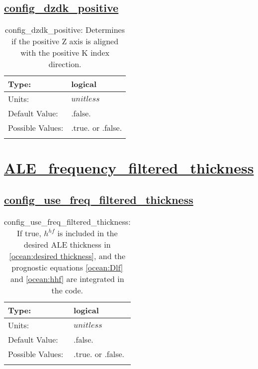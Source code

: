 \subsection[config\_dzdk\_positive]{\hyperref[sec:nm_tab_ALE_vertical_grid]{config\_dzdk\_positive}}
\label{subsec:nm_sec_config_dzdk_positive}
\begin{center}
\begin{longtable}{| p{2.0in} | p{4.0in} |}
    \hline
    Type: & logical \\
    \hline
    Units: & $unitless$ \\
    \hline
    Default Value: & .false. \\
    \hline
    Possible Values: & .true. or .false. \\
    \hline
    \caption{config\_dzdk\_positive: Determines if the positive Z axis is aligned with the positive K index direction.}
\end{longtable}
\end{center}
\section[ALE\_frequency\_filtered\_thickness]{\hyperref[sec:nm_tab_ALE_frequency_filtered_thickness]{ALE\_frequency\_filtered\_thickness}}
\label{sec:nm_sec_ALE_frequency_filtered_thickness}
\subsection[config\_use\_freq\_filtered\_thickness]{\hyperref[sec:nm_tab_ALE_frequency_filtered_thickness]{config\_use\_freq\_filtered\_thickness}}
\label{subsec:nm_sec_config_use_freq_filtered_thickness}
\begin{center}
\begin{longtable}{| p{2.0in} | p{4.0in} |}
    \hline
    Type: & logical \\
    \hline
    Units: & $unitless$ \\
    \hline
    Default Value: & .false. \\
    \hline
    Possible Values: & .true. or .false. \\
    \hline
    \caption{config\_use\_freq\_filtered\_thickness:  If true,  $h^{hf}$  is included in the desired ALE thickness in \ref{ocean:desired thickness}, and the prognostic equations \ref{ocean:Dlf} and \ref{ocean:hhf} are integrated in the code.}
\end{longtable}
\end{center}
